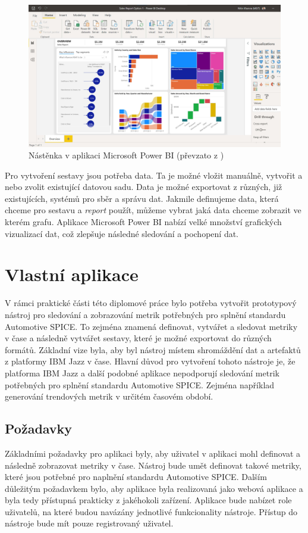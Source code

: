 \documentclass[czech,master]{diploma}
\begin{document}
\begin{figure}[!ht]
    \centering
    \includegraphics[width=1\textwidth]{Diplomka/Figures/powerbi-dashboard.jpg}
    \caption{Nástěnka v aplikaci Microsoft Power BI (převzato z \cite{ref:microsoft_bi_general})}
    \label{fig:powerbi_dashboard}
\end{figure}

Pro vytvoření sestavy jsou potřeba data. Ta je možné vložit manuálně, vytvořit a nebo zvolit existující datovou sadu. Data je možné exportovat z různých, již existujících, systémů pro sběr a správu dat. Jakmile definujeme data, která chceme pro sestavu a \textit{report} použít, můžeme vybrat jaká data chceme zobrazit ve kterém grafu. Aplikace Microsoft Power BI nabízí velké množství grafických vizualizací dat, což zlepšuje následné sledování a pochopení dat.


\chapter{Vlastní aplikace}
\label{sec:my_app}
V rámci  praktické části této diplomové práce bylo potřeba vytvořit  prototypový nástroj pro sledování a zobrazování metrik potřebných pro splnění standardu Automotive SPICE. To zejména znamená definovat, vytvářet a sledovat metriky v čase a následně vytvářet sestavy, které je možné exportovat do různých formátů. Základní vize byla, aby byl nástroj místem shromáždění dat a artefaktů z platformy IBM Jazz v čase. Hlavní důvod pro vytvoření tohoto nástroje je, že platforma IBM Jazz a další podobné aplikace nepodporují sledování metrik potřebných pro splnění standardu Automotive SPICE. Zejména například generování trendových metrik v určitém časovém období.

\section{Požadavky}
\label{sec:requirements}
Základními požadavky pro aplikaci byly, aby uživatel v aplikaci mohl definovat a následně zobrazovat metriky v čase. Nástroj bude umět definovat takové metriky, které jsou potřebné pro naplnění standardu Automotive SPICE. Dalším důležitým požadavkem bylo, aby aplikace byla realizovaná jako webová aplikace a byla tedy přístupná prakticky z jakéhokoli zařízení. Aplikace bude nabízet role uživatelů, na které budou navázány jednotlivé funkcionality nástroje. Přístup do nástroje bude mít pouze registrovaný uživatel.
\end{document}
